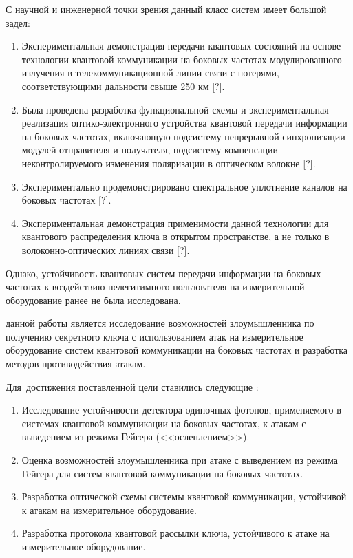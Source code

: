 С научной и инженерной точки зрения данный класс систем имеет большой задел:

\begin{enumerate}
	\item Экспериментальная демонстрация передачи квантовых состояний на основе технологии квантовой коммуникации на боковых частотах модулированного излучения в телекоммуникационной линии связи с потерями, соответствующими дальности свыше 250 км [?]. 
	\item Была проведена разработка функциональной схемы и экспериментальная реализация оптико-электронного устройства квантовой передачи информации на боковых частотах, включающую подсистему непрерывной синхронизации модулей отправителя и получателя, подсистему компенсации неконтролируемого изменения поляризации в оптическом волокне [?].
	\item Экспериментально продемонстрировано спектральное уплотнение каналов на боковых частотах [?]. 
	\item Экспериментальная демонстрация применимости данной технологии для квантового распределения ключа в открытом пространстве, а не только в волоконно-оптических линиях связи [?]. 
\end{enumerate}


Однако, устойчивость квантовых систем передачи информации на боковых частотах к воздействию нелегитимного пользователя на измерительной оборудование ранее не была исследована. 


{\aim} данной работы является исследование возможностей злоумышленника по получению секретного ключа с использованием атак на измерительное оборудование систем квантовой коммуникации на боковых частотах и разработка методов противодействия атакам.


Для~достижения поставленной цели ставились следующие {\tasks}:
\begin{enumerate}
  \item Исследование устойчивости детектора одиночных фотонов, применяемого в системах квантовой коммуникации на боковых частотах, к атакам с выведением из режима Гейгера (<<ослеплением>>). 

  \item Оценка возможностей злоумышленника при атаке с выведением из режима Гейгера для систем квантовой коммуникации на боковых частотах. 

  \item Разработка оптической схемы системы квантовой коммуникации, устойчивой к атакам на измерительное оборудование. 

  \item Разработка протокола квантовой рассылки ключа, устойчивого к атаке на измерительное оборудование. 

\end{enumerate}
